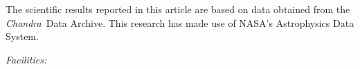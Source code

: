 \documentclass[iop, apj, numberedappendix, twocolappendix]{emulateapj}
\newcommand*{\Chandra}{\textit{Chandra}\ }
\begin{document}
\acknowledgments

The scientific results reported in this article are based on data obtained from
the \Chandra Data Archive.
This research has made use of NASA's Astrophysics Data System.

{\it Facilities:} 

\clearpage

%
%
%
%
%
%    
%
%    
%
%    
%
%    
\end{document}
